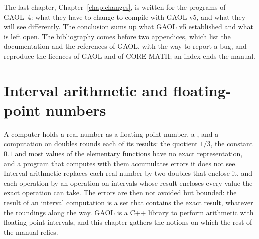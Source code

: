 \documentclass[12pt,a4paper,twoside,openright]{book}
\begin{document}
\medskip
The last chapter, Chapter~\ref{chap:changes}, is written for the programs of
GAOL~4: what they have to change to compile with GAOL v5, and what they will
see differently. The conclusion sums up what GAOL v5 established and what is
left open. The bibliography comes before two appendices, which list the
documentation and the references of GAOL, with the way to report a bug, and
reproduce the licences of GAOL and of CORE-MATH; an index ends the manual.

\clearpage
\pagestyle{YO}

\chapter{Interval arithmetic and floating-point numbers}\label{chap:concepts}
%

A computer holds a real number as a floating-point number, a ,
and a computation on doubles rounds each of its results: the quotient $1/3$,
the constant $0.1$ and most values of the elementary functions have no exact
representation, and a program that computes with them accumulates errors it
does not see. Interval arithmetic replaces each real number by two doubles
that enclose it, and each operation by an operation on intervals whose
result encloses every value the exact operation can take. The errors are
then not avoided but bounded: the result of an interval computation is a set
that contains the exact result, whatever the roundings along the way. GAOL
is a C++ library to perform arithmetic with floating-point intervals, and
this chapter gathers the notions on which the rest of the manual relies.
\end{document}
